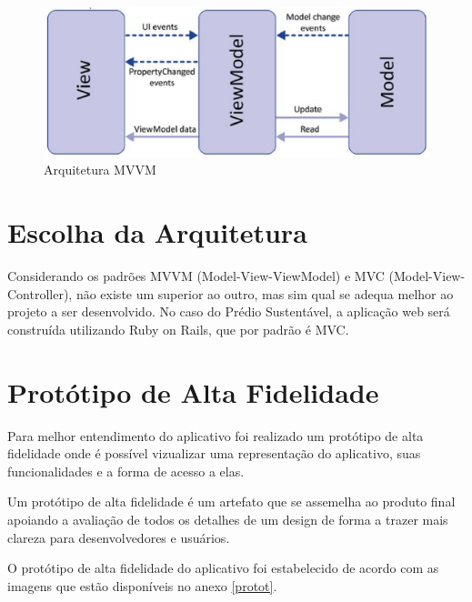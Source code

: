 \begin{figure}[!h]
  \centering
  \includegraphics[keepaspectratio=true,scale=0.6]{figuras/MVVM.eps}
  \caption{Arquitetura MVVM}
  \label{fig:mvvm}
\end{figure}

\section{Escolha da Arquitetura}

Considerando os padrões MVVM (Model-View-ViewModel) e MVC (Model-View-Controller), não existe um superior ao outro, mas sim qual se adequa melhor ao projeto a ser desenvolvido. No caso do Prédio Sustentável, a aplicação web será construída utilizando Ruby on Rails, que por padrão é MVC.

\section{Protótipo de Alta Fidelidade}
\label{sec:prot}
Para melhor entendimento do aplicativo foi realizado um protótipo de alta fidelidade onde é possível vizualizar uma representação do aplicativo, suas funcionalidades e a forma de acesso a elas.

Um protótipo de alta fidelidade é um artefato que se assemelha ao produto final apoiando a avaliação de todos os detalhes de um design de forma a trazer mais clareza para desenvolvedores e usuários.

O protótipo de alta fidelidade do aplicativo foi estabelecido de acordo com as imagens que estão disponíveis no anexo \ref{protot}.

